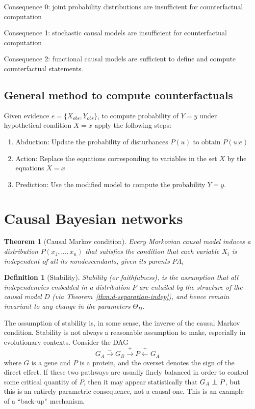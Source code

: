 \documentclass[11pt]{article}
\numberwithin{equation}{section}
\newcommand\indep{\protect\mathpalette{\protect\independenT}{\perp}}
\def\independenT#1#2{\mathrel{\rlap{$#1#2$}\mkern2mu{#1#2}}}
\newtheorem{thm}{Theorem}[section]
\newtheorem{defn}{Definition}[section]
\begin{document}
Consequence 0: joint probability distributions are insufficient for counterfactual computation

Consequence 1: stochastic causal models are insufficient for counterfactual computation

Consequence 2: functional causal models are sufficient to define and compute counterfactual statements.

\subsection{General method to compute counterfactuals}
Given evidence $e=\{X_{obs}, Y_{obs}\}$, to compute probability of $Y=y$ under hypothetical condition $X=x$ apply the following steps:
\begin{enumerate}[noitemsep]
\item Abduction: Update the probability of disturbances $P(u)$ to obtain $P(u|e)$
\item Action: Replace the equations corresponding to variables in the set $X$ by the equations $X=x$
\item Prediction: Use the modified model to compute the probability $Y=y$.
\end{enumerate}

\section{Causal Bayesian networks}

\begin{thm}[Causal Markov condition]
Every Markovian causal model induces a distribution $P(x_1,...,x_n)$ that satisfies the condition that each variable $X_i$ is independent of all its nondescendants, given its parents $PA_i$
\end{thm}

\begin{defn}[Stability]
Stability (or faithfulness), is the assumption that all independencies embedded in a distribution $P$ are entailed by the structure of the causal model $D$ (via Theorem~\ref{thm:d-separation-indep}), and hence remain invariant to any change in the parameters $\Theta_D$.
\end{defn}

The assumption of stability is, in some sense, the inverse of the causal Markov condition. Stability is not always a reasonable assumption to make, especially in evolutionary contexts. Consider the DAG 
\begin{equation}
G_A \overset{-}{\rightarrow} G_B \overset{+}{\rightarrow} P \overset{+}{\leftarrow} G_A
\end{equation}
where $G$ is a gene and $P$ is a protein, and the overset denotes the sign of the direct effect. If these two pathways are usually finely balanced in order to control some critical quantity of $P$, then it may appear statistically that $G_A \indep P$, but this is an entirely parametric consequence, not a causal one. This is an example of a ``back-up'' mechanism.
\end{document}
